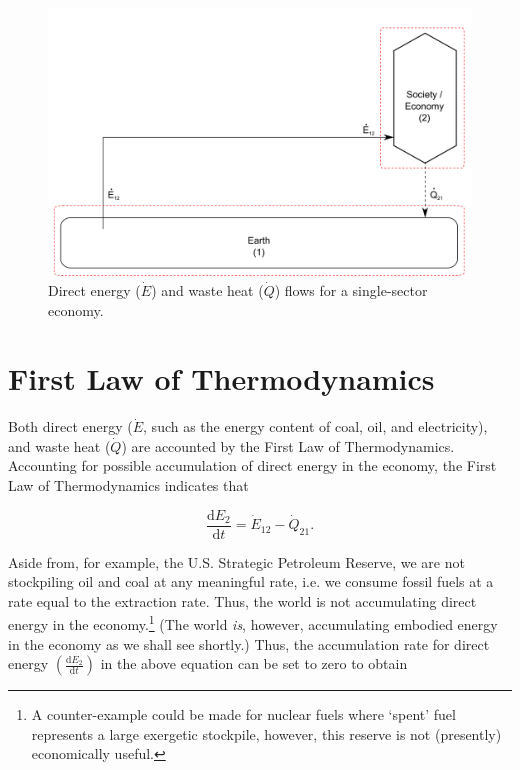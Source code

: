 \begin{figure}[h!]
\includegraphics[width=1.0\linewidth]{Chapter_Example_A/images/I-O_one_sector_direct_energy.pdf}
\caption{Direct energy ($\dot{E}$) and waste heat ($\dot{Q}$) flows for a single-sector economy. }
\label{fig:single_sector_flows_0}
\end{figure}

\section{First Law of Thermodynamics}

Both direct energy ($\dot{E}$, such as the energy content of coal, oil, and electricity), and waste heat ($\dot{Q}$) are accounted by the First Law of Thermodynamics. Accounting for possible accumulation of direct energy in the economy, the First Law of Thermodynamics indicates that

\begin{equation} \label{eq:dE_2/dt_single_sector}
	\frac{\mathrm{d}E_{2}}{\mathrm{d}t} = \dot{E}_{12} - \dot{Q}_{21}.
\end{equation}

Aside from, for example, the U.S. Strategic Petroleum Reserve, we are not stockpiling oil and coal at any meaningful rate, i.e. we consume fossil fuels at a rate equal to the extraction rate. Thus, the world is not accumulating direct energy in the economy.\footnote{A counter-example could be made for nuclear fuels where `spent' fuel represents a large exergetic stockpile, however, this reserve is not (presently) economically useful.} (The world \emph{is}, however, accumulating embodied energy in the economy as we shall see shortly.) Thus, the accumulation rate for direct energy $\left(\frac{\mathrm{d}E_{2}}{\mathrm{d}t}\right)$ in the above equation can be set to zero to obtain

